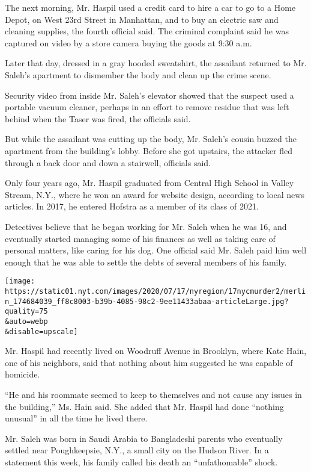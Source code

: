 The next morning, Mr. Haspil used a credit card to hire a car to go to a
Home Depot, on West 23rd Street in Manhattan, and to buy an electric saw
and cleaning supplies, the fourth official said. The criminal complaint
said he was captured on video by a store camera buying the goods at 9:30
a.m.

Later that day, dressed in a gray hooded sweatshirt, the assailant
returned to Mr. Saleh's apartment to dismember the body and clean up the
crime scene.

Security video from inside Mr. Saleh's elevator showed that the suspect
used a portable vacuum cleaner, perhaps in an effort to remove residue
that was left behind when the Taser was fired, the officials said.

But while the assailant was cutting up the body, Mr. Saleh's cousin
buzzed the apartment from the building's lobby. Before she got upstairs,
the attacker fled through a back door and down a stairwell, officials
said.

Only four years ago, Mr. Haspil graduated from Central High School in
Valley Stream, N.Y., where he won an award for website design, according
to local news articles. In 2017, he entered Hofstra as a member of its
class of 2021.

Detectives believe that he began working for Mr. Saleh when he was 16,
and eventually started managing some of his finances as well as taking
care of personal matters, like caring for his dog. One official said Mr.
Saleh paid him well enough that he was able to settle the debts of
several members of his family.

\texttt{[image: https://static01.nyt.com/images/2020/07/17/nyregion/17nycmurder2/merlin\_174684039\_ff8c8003-b39b-4085-98c2-9ee11433abaa-articleLarge.jpg?quality=75\\\&auto=webp\\\&disable=upscale]}

Mr. Haspil had recently lived on Woodruff Avenue in Brooklyn, where Kate
Hain, one of his neighbors, said that nothing about him suggested he was
capable of homicide.

``He and his roommate seemed to keep to themselves and not cause any
issues in the building,'' Ms. Hain said. She added that Mr. Haspil had
done ``nothing unusual'' in all the time he lived there.

Mr. Saleh was born in Saudi Arabia to Bangladeshi parents who eventually
settled near Poughkeepsie, N.Y., a small city on the Hudson River. In a
statement this week, his family called his death an ``unfathomable''
shock.

